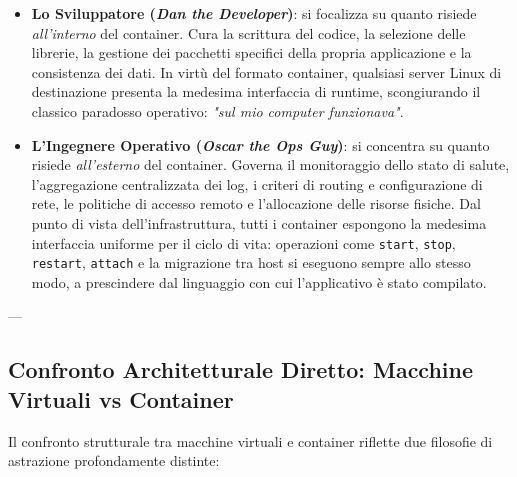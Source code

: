 \documentclass[11pt, a4paper]{article}
\begin{document}
\begin{itemize}
    \item \textbf{Lo Sviluppatore (\emph{Dan the Developer})}: si focalizza su quanto risiede \emph{all'interno} del container. Cura la scrittura del codice, la selezione delle librerie, la gestione dei pacchetti specifici della propria applicazione e la consistenza dei dati. In virtù del formato container, qualsiasi server Linux di destinazione presenta la medesima interfaccia di runtime, scongiurando il classico paradosso operativo: \emph{"sul mio computer funzionava"}.
    \item \textbf{L'Ingegnere Operativo (\emph{Oscar the Ops Guy})}: si concentra su quanto risiede \emph{all'esterno} del container. Governa il monitoraggio dello stato di salute, l'aggregazione centralizzata dei log, i criteri di routing e configurazione di rete, le politiche di accesso remoto e l'allocazione delle risorse fisiche. Dal punto di vista dell'infrastruttura, tutti i container espongono la medesima interfaccia uniforme per il ciclo di vita: operazioni come \texttt{start}, \texttt{stop}, \texttt{restart}, \texttt{attach} e la migrazione tra host si eseguono sempre allo stesso modo, a prescindere dal linguaggio con cui l'applicativo è stato compilato.
\end{itemize}

---

\subsection{Confronto Architetturale Diretto: Macchine Virtuali vs Container}

Il confronto strutturale tra macchine virtuali e container riflette due filosofie di astrazione profondamente distinte:

\end{document}
